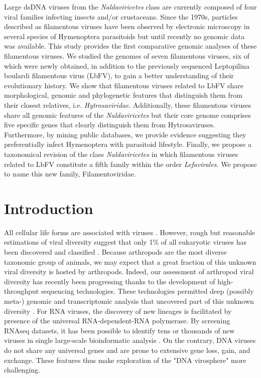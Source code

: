 Large dsDNA viruses from the \textit{Naldaviricetes} class are currently composed of four viral families infecting insects and/or crustaceans. Since the 1970s, particles described as filamentous viruses have been observed by electronic microscopy in several species of Hymenoptera parasitoids but until recently no genomic data was available. This study provides the first comparative genomic analyses of these filamentous viruses. We studied the genomes of seven filamentous viruses, six of which were newly obtained, in addition to the previously sequenced Leptopilina boulardi filamentous virus (LbFV), to gain a better understanding of their evolutionary history. We show that filamentous viruses related to LbFV share morphological, genomic and phylogenetic features that distinguish them from their closest relatives, i.e. \textit{Hytrosaviridae}. Additionally, these filamentous viruses share all genomic features of the \textit{Naldaviricetes} but their core genome comprises five specific genes that clearly distinguish them from Hytrosaviruses. Furthermore, by mining public databases, we provide evidence suggesting they preferentially infect Hymenoptera with parasitoid lifestyle. Finally, we propose a taxonomical revision of the class \textit{Naldaviricetes} in which filamentous viruses related to LbFV constitute a fifth family within the order \textit{Lefavirales}. We propose to name this new family, Filamentoviridae. 

\section{Introduction}

All cellular life forms are associated with viruses \citep{kristensen_new_2010,koonin_virocentric_2013}. However, rough but reasonable estimations of viral diversity suggest that only 1\% of all eukaryotic viruses has been discovered and classified \citep{geoghegan_comparative_2017}. Because arthropods are the most diverse taxonomic group of animals, we may expect that a great fraction of this unknown viral diversity is hosted by arthropods. Indeed, our assessment of arthropod viral diversity has recently been progressing thanks to the development of high-throughput sequencing technologies. These technologies permitted deep (possibly meta-) genomic and transcriptomic analysis that uncovered part of this unknown diversity \citep{ dolja_metagenomics_2018,roux_diversity_2022, wu_abundant_2020,schulz_giant_2020}. For RNA viruses, the discovery of new lineages is facilitated by presence of the universal RNA-dependent-RNA polymerase. By screening RNAseq datasets, it has been possible to identify tens or thousands of new viruses in single large-scale bioinformatic analysis \citep{shi_evolutionary_2018, wu_abundant_2020, medd_virome_2018,obbard_new_2020}. On the contrary, DNA viruses do not share any universal genes \citep{koonin_global_2020} and are prone to extensive gene loss, gain, and exchange. These features thus make exploration of the "DNA virosphere" more challenging.  

